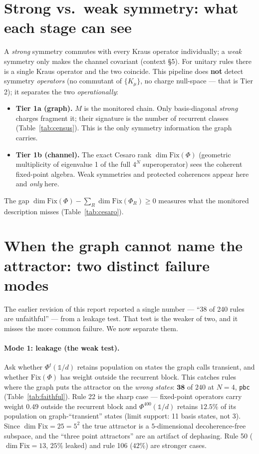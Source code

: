 \documentclass[11pt]{article}
\newcommand{\rt}[1]{\texttt{#1}}
\begin{document}
\section{Strong vs.\ weak symmetry: what each stage can see}
\label{sec:strongweak}
A \emph{strong} symmetry commutes with every Kraus operator individually; a
\emph{weak} symmetry only makes the channel covariant (context \S5). For unitary
rules there is a single Kraus operator and the two coincide. This pipeline does
\textbf{not} detect symmetry \emph{operators} (no commutant of $\{K_\mu\}$, no
charge null-space --- that is Tier 2); it separates the two \emph{operationally}:

\begin{itemize}
  \item \textbf{Tier 1a (graph).} $M$ is the monitored chain. Only
  basis-diagonal \emph{strong} charges fragment it; their signature is the number
  of recurrent classes (Table~\ref{tab:census}). This is the only symmetry
  information the graph carries.
  \item \textbf{Tier 1b (channel).} The exact Cesaro rank
  $\dim\mathrm{Fix}(\Phi)$ (geometric multiplicity of eigenvalue 1 of the full
  $4^N$ superoperator) sees the coherent fixed-point algebra. Weak symmetries and
  protected coherences appear here and \emph{only} here.
\end{itemize}
The gap $\dim\mathrm{Fix}(\Phi)-\sum_R\dim\mathrm{Fix}(\Phi_R)\ge 0$ measures what
the monitored description misses (Table~\ref{tab:cesaro}).

\section{When the graph cannot name the attractor: two distinct failure modes}
\label{sec:failures}
\label{sec:failure}
The earlier revision of this report reported a single number --- ``38 of 240
rules are unfaithful'' --- from a leakage test. That test is the weaker of two,
and it misses the more common failure. We now separate them.

\paragraph{Mode 1: leakage (the weak test).} Ask whether
$\Phi^{t}(\mathbb{1}/d)$ retains population on states the graph calls transient,
and whether $\mathrm{Fix}(\Phi)$ has weight outside the recurrent block. This
catches rules where the graph puts the attractor on the \emph{wrong states}:
$\mathbf{38}$ of $240$ at $N=4$, \rt{pbc} (Table~\ref{tab:faithful}). Rule 22 is
the sharp case --- fixed-point operators carry weight $0.49$ outside the
recurrent block and $\Phi^{400}(\mathbb{1}/d)$ retains $12.5\%$ of its population
on graph-``transient'' states (limit support: 11 basis states, not 3). Since
$\dim\mathrm{Fix}=25=5^2$ the true attractor is a $5$-dimensional
decoherence-free subspace, and the ``three point attractors'' are an artifact of
dephasing. Rule 50 ($\dim\mathrm{Fix}=13$, $25\%$ leaked) and rule 106 ($42\%$)
are stronger cases.
\end{document}
